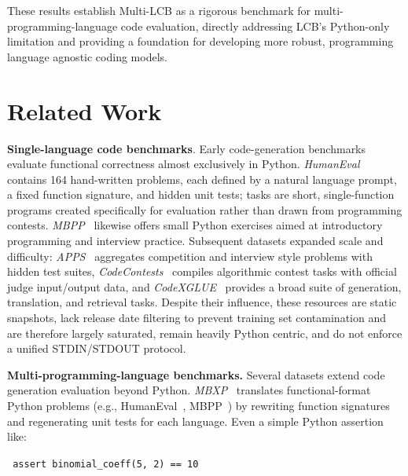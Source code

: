 \documentclass{llmxive}
\begin{document}
These results establish Multi-LCB as a rigorous benchmark for multi-programming-language code evaluation, directly addressing LCB’s Python-only limitation and providing a foundation for developing more robust, programming language agnostic coding models.

\section{Related Work}
\label{sec_related_work}

\textbf{Single-language code benchmarks}. 
Early code-generation benchmarks evaluate functional correctness almost exclusively in Python. \textit{HumanEval}~\citep{chen2021evaluating} contains 164 hand-written problems, each defined by a natural language prompt, a fixed function signature, and hidden unit tests; tasks are short, single-function programs created specifically for evaluation rather than drawn from programming contests. \textit{MBPP}~\citep{austin2021program} likewise offers small Python exercises aimed at introductory programming and interview practice. Subsequent datasets expanded scale and difficulty: \textit{APPS}~\citep{hendrycks2021measuring} aggregates competition and interview style problems with hidden test suites, \textit{CodeContests}~\citep{li2022competition} compiles algorithmic contest tasks with official judge input/output data, and \textit{CodeXGLUE}~\citep{lu2021codexglue} provides a broad suite of generation, translation, and retrieval tasks.
Despite their influence, these resources are static snapshots, lack release date filtering to prevent training set contamination and are therefore largely saturated, remain heavily Python centric, and do not enforce a unified STDIN/STDOUT protocol. %

\textbf{Multi-programming-language benchmarks.}
Several datasets extend code generation evaluation beyond Python. \textit{MBXP}~\citep{athiwaratkun2022multi} translates functional-format Python problems (e.g., HumanEval~\citep{chen2021evaluating}, MBPP~\citep{austin2021program}) by rewriting function signatures and regenerating unit tests for each language. Even a simple Python assertion like: 

\texttt{ \qquad \qquad \qquad \qquad
assert\ 
binomial\_coeff(5, 2)\ 
==\ 
10
} 
\end{document}
